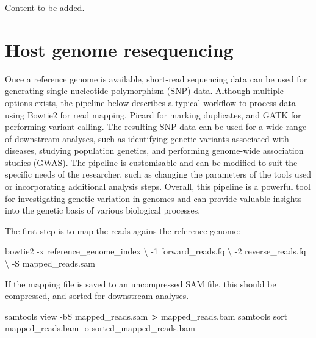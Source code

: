 \documentclass[
]{book}
\newenvironment{Shaded}{\begin{snugshade}}{\end{snugshade}}
\newcommand{\AttributeTok}[1]{\textcolor[rgb]{0.13,0.29,0.53}{#1}}
\newcommand{\DataTypeTok}[1]{\textcolor[rgb]{0.13,0.29,0.53}{#1}}
\newcommand{\ExtensionTok}[1]{#1}
\newcommand{\NormalTok}[1]{#1}
\newcommand{\OperatorTok}[1]{\textcolor[rgb]{0.81,0.36,0.00}{\textbf{#1}}}
\begin{document}
Content to be added.

\hypertarget{host-resequencing}{%
\section{Host genome resequencing}\label{host-resequencing}}

Once a reference genome is available, short-read sequencing data can be used for generating single nucleotide polymorphism (SNP) data. Although multiple options exists, the pipeline below describes a typical workflow to process data using Bowtie2 for read mapping, Picard for marking duplicates, and GATK for performing variant calling. The resulting SNP data can be used for a wide range of downstream analyses, such as identifying genetic variants associated with diseases, studying population genetics, and performing genome-wide association studies (GWAS). The pipeline is customisable and can be modified to suit the specific needs of the researcher, such as changing the parameters of the tools used or incorporating additional analysis steps. Overall, this pipeline is a powerful tool for investigating genetic variation in genomes and can provide valuable insights into the genetic basis of various biological processes.

The first step is to map the reads agains the reference genome:
\small

\begin{Shaded}
\begin{Highlighting}[]
\ExtensionTok{bowtie2} \AttributeTok{{-}x}\NormalTok{ reference\_genome\_index }\DataTypeTok{\textbackslash{}}
    \AttributeTok{{-}1}\NormalTok{ forward\_reads.fq }\DataTypeTok{\textbackslash{}}
    \AttributeTok{{-}2}\NormalTok{ reverse\_reads.fq }\DataTypeTok{\textbackslash{}}
    \AttributeTok{{-}S}\NormalTok{ mapped\_reads.sam}
\end{Highlighting}
\end{Shaded}

\normalsize

If the mapping file is saved to an uncompressed SAM file, this should be compressed, and sorted for downstream analyses.
\small

\begin{Shaded}
\begin{Highlighting}[]
\ExtensionTok{samtools}\NormalTok{ view }\AttributeTok{{-}bS}\NormalTok{ mapped\_reads.sam }\OperatorTok{\textgreater{}}\NormalTok{ mapped\_reads.bam}
\ExtensionTok{samtools}\NormalTok{ sort mapped\_reads.bam }\AttributeTok{{-}o}\NormalTok{ sorted\_mapped\_reads.bam}
\end{Highlighting}
\end{Shaded}
\end{document}
